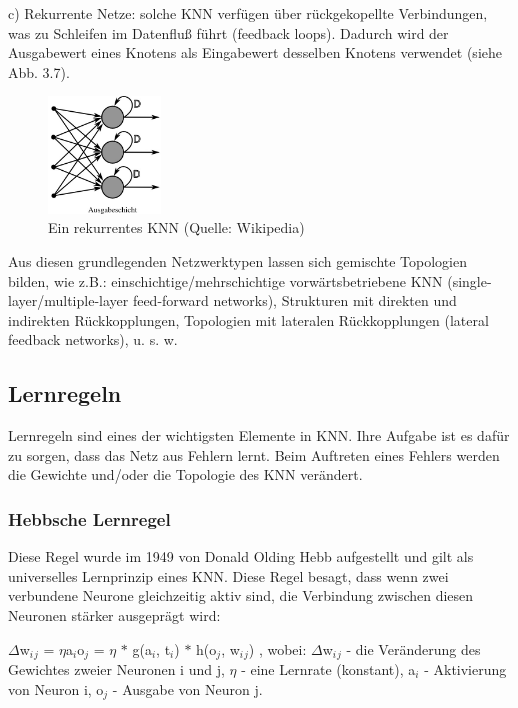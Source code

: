 c) Rekurrente Netze: solche KNN verfügen über rückgekopellte Verbindungen, was zu Schleifen im Datenfluß führt (feedback loops). Dadurch wird der Ausgabewert eines Knotens als Eingabewert desselben Knotens verwendet (siehe Abb. 3.7).

\begin{figure}[h]
\centering
\includegraphics[width=3cm]{chapters/neural_networks/recurrent.jpg}

\caption{Ein rekurrentes KNN (Quelle: Wikipedia)}
	\label{img:recurrent}

\end{figure}

Aus diesen grundlegenden Netzwerktypen lassen sich gemischte Topologien bilden, wie z.B.: einschichtige/mehrschichtige vorwärtsbetriebene KNN (single-layer/multiple-layer feed-forward networks), Strukturen mit direkten und indirekten Rückkopplungen, Topologien mit lateralen Rückkopplungen (lateral feedback networks), u. s. w.

\subsection{Lernregeln}

Lernregeln sind eines der wichtigsten Elemente in KNN. Ihre Aufgabe ist es dafür zu sorgen, dass das Netz aus Fehlern lernt. Beim Auftreten eines Fehlers werden die Gewichte und/oder die Topologie des KNN verändert.

\subsubsection{Hebbsche Lernregel}

Diese Regel wurde im 1949 von Donald Olding Hebb aufgestellt und gilt als universelles Lernprinzip eines KNN. Diese Regel besagt, dass wenn zwei verbundene Neurone gleichzeitig aktiv sind, die Verbindung zwischen diesen Neuronen stärker ausgeprägt wird:

$\Delta$w$_i$$_j$ = $\eta$a$_i$o$_j$ = $\eta$ $*$ g(a$_i$, t$_i$) $*$ h(o$_j$, w$_i$$_j$) ,
\newline
 wobei:  $\Delta$w$_i$$_j$ - die Veränderung des Gewichtes zweier Neuronen i und j,  $\eta$ - eine Lernrate (konstant), a$_i$ - Aktivierung von Neuron i, o$_j$ - Ausgabe von Neuron j.


